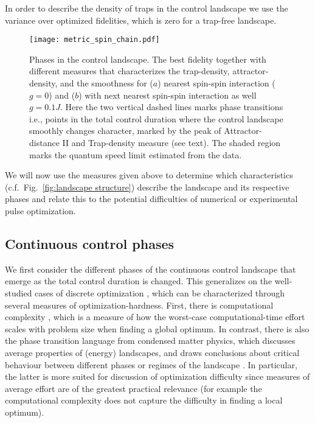 \documentclass[aps, twocolumn,superscriptaddress]{revtex4-1}
\begin{document}
In order to describe the density of traps in the control landscape we use the variance over optimized fidelities, which is zero for a trap-free landscape. 


\begin{figure*}
    \centering
    \texttt{[image: metric\_spin\_chain.pdf]}
    \caption{Phases in the control landscape. The best fidelity together with different measures that characterizes the trap-density, attractor-density, and the smoothness for ($a$) nearest spin-spin interaction ($g = 0$) and ($b$) with next nearest spin-spin interaction as well $g = 0.1J$. Here the two vertical dashed lines marks phase transitions i.e., points in the total control duration where the control landscape smoothly changes character, marked by the peak of Attractor-distance II and Trap-density measure (see text). The shaded region marks the quantum speed limit estimated from the data. }
    \label{fig:spin_chain_metric}
\end{figure*}

We will now use the measures given above to determine which characteristics (c.f.~Fig.~\ref{fig:landscape structure}) describe the landscape and its respective phases and relate this to the potential difficulties of numerical or experimental pulse optimization. 

\subsection{Continuous control phases}
We first consider the different phases of the continuous control landscape that emerge as the total control duration is changed. This generalizes on the well-studied cases of discrete optimization \cite{parker2014discrete}, which can be characterized through several measures of optimization-hardness. First, there is computational complexity \cite{bernstein1997quantum}, which is a measure of how the worst-case computational-time effort scales with problem size when finding a global optimum. In contrast, there is also the phase transition language from condensed matter physics, which discusses average properties of (energy) landscapes, and draws conclusions about critical behaviour between different phases or regimes of the landscape \cite{smith1996locating,xu2000exact,gent1996tsp}.  In particular, the latter is more suited for discussion of optimization difficulty since measures of average effort are of the greatest practical relevance (for example the computational complexity does not capture the difficulty in finding a local optimum).
\end{document}
